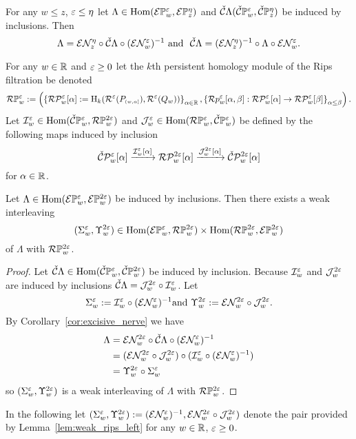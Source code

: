 \begin{corollary}\label{cor:excisive_nerve}
 For any $w\leq z$, $\e\leq\eta$ let $\Lambda\in\Hom(\E\PP{w}{\e},\E\PP{z}{\eta})$ and $\cech\Lambda(\CPP{w}{\e},\CPP{z}{\eta})$ be induced by inclusions.
 Then
 \[\Lambda = \E\N_{z}^{\eta}\circ \cech\Lambda\circ (\E\N_w^\e)^{-1}\text{ and }\ \cech\Lambda = (\E\N_{z}^{\eta})^{-1}\circ \Lambda\circ \E\N_w^\e.\]
\end{corollary}

For any $w\in\R$ and $\e\geq 0$ let the $k$th persistent homology module of the Rips filtration be denoted
\[\RPP{w}{\e} := \left(\left\{\RP{w}{\e}{\alpha} := \hom_k(\rips^\e(P\subi{w,\alpha}),\rips^\e(Q_w))\right\}_{\alpha\in\R}, \left\{\rips p_w^\e[\alpha,\beta] : \RP{w}{\e}{\alpha}\to\RP{w}{\e}{\beta}\right\}_{\alpha\leq\beta}\right).\]
Let $\I_w^\e\in\Hom(\CPP{w}{\e}, \RPP{w}{2\e})$ and $\J_w^\e\in\Hom(\RPP{w}{\e},\CPP{w}{\e})$ be defined by the following maps induced by inclusion
\[ \CP{w}{\e}{\alpha}\xrightarrow{\I_w^\e[\alpha]} \RP{w}{2\e}{\alpha}\xrightarrow{\J_w^{2\e}[\alpha]}\CP{w}{2\e}{\alpha}\]
for $\alpha\in\R$.

\begin{lemma}\label{lem:weak_rips_left}
  Let $\Lambda\in\Hom(\ext{\PP{w}{\e}}, \ext{\PP{w}{2\e}})$ be induced by inclusions.
  Then there exists a weak interleaving
  \[ (\Sigma_w^\e, \Upsilon_w^{2\e})\in \Hom(\ext{\PP{w}{\e}}, \RPP{w}{2\e})\times \Hom(\RPP{w}{2\e},\ext{\PP{w}{2\e}})\]
  of $\Lambda$ with $\RPP{w}{2\e}$.
\end{lemma}
\begin{proof}
  Let $\cech\Lambda\in\Hom(\CPP{w}{\e},\CPP{w}{2\e})$ be induced by inclusion.
  Because $\I_w^\e$ and $\J_w^{2\e}$ are induced by inclusions $\cech\Lambda = \J_w^{2\e}\circ \I_w^\e$.
  Let
  \[ \Sigma_w^\e := \I_w^\e\circ (\E\N_w^\e)^{-1}\text{and}\ \Upsilon_w^{2\e} := \E\N_w^{2\e}\circ \J_w^{2\e}.\]
  By Corollary~\ref{cor:excisive_nerve} we have
  \begin{align*}
    \Lambda &= \E\N_w^{2\e}\circ \cech\Lambda\circ (\E\N_w^\e)^{-1}\\
      &= (\E\N_w^{2\e}\circ \J_w^{2\e})\circ (\I_w^\e\circ (\E\N_w^\e)^{-1})\\
      &= \Upsilon_w^{2\e}\circ \Sigma_w^\e
  \end{align*}
  so $(\Sigma_w^\e, \Upsilon_w^{2\e})$ is a weak interleaving of $\Lambda$ with $\RPP{w}{2\e}$.
\end{proof}

In the following let $(\Sigma_w^\e, \Upsilon_w^{2\e}) := (\E\N_w^\e)^{-1}, \E\N_w^{2\e}\circ \J_w^{2\e})$ denote the pair provided by Lemma~\ref{lem:weak_rips_left} for any $w\in\R$, $\e\geq 0$.

